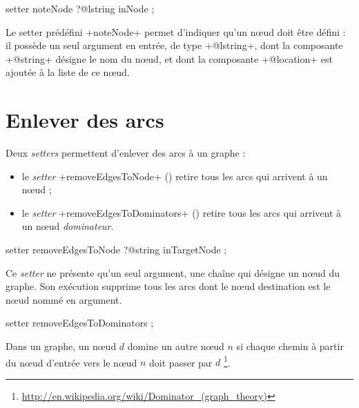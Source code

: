 
\begin{galgascode}
setter noteNode ?@lstring inNode ;
\end{galgascode}

Le setter prédéfini \ggs+noteNode+ permet d'indiquer qu'un nœud doit être défini : il possède un seul argument en entrée, de type \ggs+@lstring+, dont la composante \ggs+@string+ désigne le nom du nœud, et dont la composante \ggs+@location+ est ajoutée à la liste de ce nœud.



\section{Enlever des arcs}

Deux \emph{setters} permettent d'enlever des arcs à un graphe :
\begin{itemize}
  \item le \emph{setter} \ggs+removeEdgesToNode+ () retire tous les arcs qui arrivent à un nœud ;
  \item le \emph{setter} \ggs+removeEdgesToDominators+ () retire tous les arcs qui arrivent à un nœud \emph{dominateur}.
\end{itemize}




\begin{galgascode}
setter removeEdgesToNode ?@string inTargetNode ;
\end{galgascode}

Ce \emph{setter} ne présente qu'un seul argument, une chaîne qui désigne un nœud du graphe. Son exécution supprime tous les arcs dont le nœud destination est le nœud nommé en argument.


\begin{galgascode}
setter removeEdgesToDominators ;
\end{galgascode}

Dans un graphe, un nœud $d$ domine un autre nœud $n$ si chaque chemin à partir du nœud d'entrée vers le nœud $n$ doit passer par $d$ \footnote{\url{http://en.wikipedia.org/wiki/Dominator_(graph_theory)}}.

